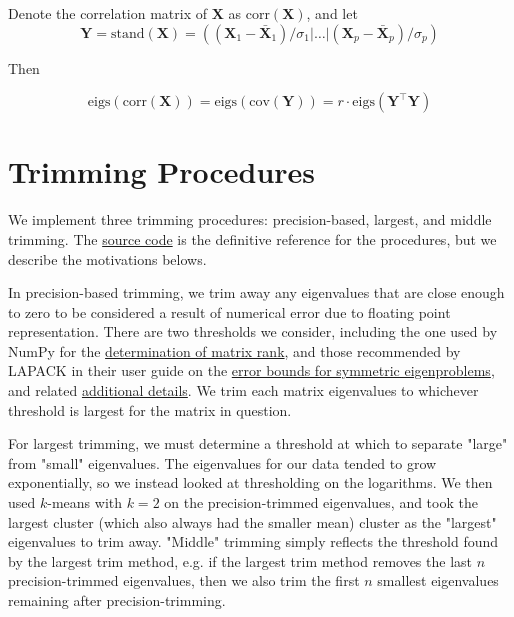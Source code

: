 \documentclass[12pt]{spieman}  %
\begin{document}
\begin{spacing}{2}
Denote the correlation matrix of \(\mathbf{X}\) as \(\text{corr}(\mathbf{X})\), and let
\[
\mathbf{Y} = \text{stand}(\mathbf{X}) =
\left(
(\mathbf{X}_1 - \bar{\mathbf{X}}_1) / \sigma_1 | \dots | (\mathbf{X}_p - \bar{\mathbf{X}}_p) / \sigma_p
\right)
\]

Then

\[
\text{eigs}\left( \text{corr}(\mathbf{X})  \right)
= \text{eigs}\left( \text{cov}(\mathbf{Y})  \right)
= r \cdot \text{eigs}(\mathbf{Y}^{\top}\mathbf{Y})
\]

\section{Trimming Procedures}
\label{sec:trimming}

We implement three trimming procedures: precision-based, largest, and middle
trimming. The
\href{https://github.com/DM-Berger/random-matrix-fmri/blob/7c9e4187f582dedee728cd7193b8894d928c2f00/code/rmt/updated_dataset.py#L431-L444}{source
code} is the definitive reference for the procedures, but we describe the
motivations belows.

In precision-based trimming, we trim away any eigenvalues that are close enough
to zero to be considered a result of numerical error due to floating point
representation. There are two thresholds we consider, including the one used by
NumPy\cite{harrisArrayProgrammingNumPy2020} for the
\href{https://numpy.org/doc/stable/reference/generated/numpy.linalg.matrix_rank.html}{determination
of matrix rank}, and those recommended by LAPACK\cite{laug} in their user
guide\cite{andersonLAPACKUsersGuide1999a} on the
\href{https://netlib.org/lapack/lug/node89.html}{error bounds for symmetric
eigenproblems}, and related
\href{https://netlib.org/lapack/lug/node90.html}{additional details}. We trim
each matrix eigenvalues to whichever threshold is largest for the matrix in
question.

For largest trimming, we must determine a threshold at which to separate
"large" from "small" eigenvalues. The eigenvalues for our data tended to grow
exponentially, so we instead looked at thresholding on the logarithms. We then
used \(k\)-means with \(k=2\) on the precision-trimmed eigenvalues, and took
the largest cluster (which also always had the smaller mean) cluster as the
"largest" eigenvalues to trim away. "Middle" trimming simply reflects the
threshold found by the largest trim method, e.g. if the largest trim method
removes the last \(n\) precision-trimmed eigenvalues, then we also trim the
first \(n\) smallest eigenvalues remaining after precision-trimming.


\end{spacing}
\end{document}
